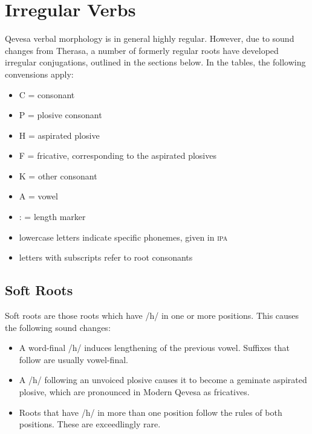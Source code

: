 \documentclass[grammar]{subfiles}
\begin{document}

  \newpage
  \section{Irregular Verbs}
  \label{sec:vm_irregular}

  Qevesa verbal morphology is in general highly regular.  However, due to sound
  changes from Therasa, a number of formerly regular roots have developed
  irregular conjugations, outlined in the sections below.  In the tables, the
  following convensions apply: 

  \begin{itemize}
    \item C = consonant
    \item P = plosive consonant
    \item H = aspirated plosive
    \item F = fricative, corresponding to the aspirated plosives
    \item K = other consonant
    \item A = vowel
    \item : = length marker
    \item lowercase letters indicate specific phonemes, given in \textsc{ipa}
    \item letters with subscripts refer to root consonants
  \end{itemize}
  

  \subsection{Soft Roots}
  \label{ssec:vm_soft_roots}

  Soft roots are those roots which have /h/ in one or more positions.  This causes the following sound changes:

  \begin{itemize}
    \item A word-final /h/ induces lengthening of the previous vowel.  Suffixes
      that follow are usually vowel-final.
    \item A /h/ following an unvoiced plosive causes it to become a geminate
      aspirated plosive, which are pronounced in Modern Qevesa as fricatives.
    \item Roots that have /h/ in more than one position follow the rules of both positions.  These are exceedlingly rare.
  \end{itemize}
\end{document}
